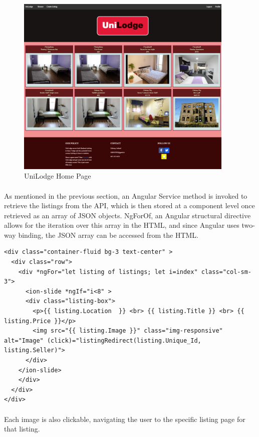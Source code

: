 \begin{figure}[H]
	\caption{UniLodge Home Page}
	\label{image:home}
	\centering
	\includegraphics[width=0.93\textwidth]{images/home.png}
\end{figure}	

\paragraph{}
As mentioned in the previous section, an Angular Service method is invoked to retrieve the listings from the API, which is then stored at a component level once retrieved as an array of JSON objects. NgForOf, an Angular structural directive allows for the iteration over this array in the HTML, and since Angular uses two-way binding, the JSON array can be accessed from the HTML. \newline

\begin{lstlisting}[caption=NgFor to Display Listings]
<div class="container-fluid bg-3 text-center" >    
  <div class="row">
    <div *ngFor="let listing of listings; let i=index" class="col-sm-3">
      <ion-slide *ngIf="i<8" >   
      <div class="listing-box">
        <p>{{ listing.Location  }} <br> {{ listing.Title }} <br> {{ listing.Price }}</p>
        <img src="{{ listing.Image }}" class="img-responsive" alt="Image" (click)="listingRedirect(listing.Unique_Id, listing.Seller)">
      </div>
    </ion-slide>
    </div>
  </div>
</div>
\end{lstlisting}

\paragraph{}
Each image is also clickable, navigating the user to the specific listing page for that listing.

